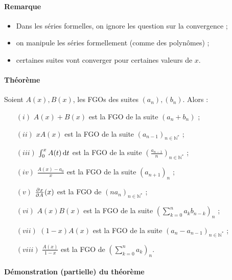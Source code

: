 \documentclass{article}
\newenvironment{lst}
	{\begin{minipage}[t]{.9\linewidth}\begin{itemize}}
	{\end{itemize}\end{minipage}}
\begin{document}
			\paragraph{Remarque}
			\begin{lst}
				\item Dans les séries formelles, on ignore les question sur la convergence ;
				\item on manipule les séries formellement (comme des polynômes) ;
				\item certaines suites vont converger pour certaines valeurs de $x$.
			\end{lst}

			\paragraph{Théorème} Soient $A(x), B(x)$, les FGOs des suites $(a_n), (b_n)$. Alors :

			\begin{itemize}
				\item[$(i)$]    $A(x) + B(x)$ est la FGO de la suite $(a_n + b_n)$ ;
				\item[$(ii)$]   $xA(x)$ est la FGO de la suite $(a_{n-1})_{n\in\mathbb N^*}$ ;
				\item[$(iii)$]  $\int_0^xA(t)\dif t$ est la FGO de la suite $\left(\frac {a_{n-1}}n\right)_{n\in\mathbb N^*}$ ;
				\item[$(iv)$]   $\frac {A(x) - a_0}x$ est la FGO de la suite $(a_{n+1})_n$ ;
				\item[$(v)$]    $\pd xA(x)$ est la FGO de $(na_n)_{n\in\mathbb N^*}$ ;
				\item[$(vi)$]   $A(x)B(x)$ est la FGO de la suite $\left(\sum_{k=0}^na_kb_{n-k}\right)_n$ ;
				\item[$(vii)$]  $(1-x)A(x)$ est la FGO de la suite $\left(a_n - a_{n-1}\right)_{n\in\mathbb N^*}$ ;
				\item[$(viii)$] $\frac {A(x)}{1-x}$ est la FGO de $\left(\sum_{k=0}^na_k\right)_n$.
			\end{itemize}

			\paragraph{Démonstration (partielle) du théorème}
			
\end{document}
